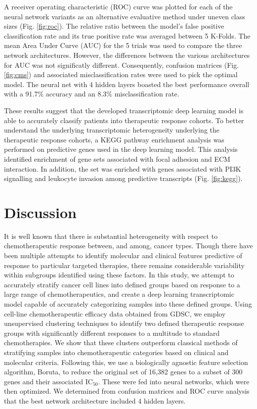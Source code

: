 \documentclass[10pt, letterpaper]{article}
\begin{document}
\begin{multicols}{2}
A receiver operating characteristic (ROC) curve was plotted for each of the neural network variants as an alternative evaluative method under uneven class sizes (Fig. \ref{fig:roc}). The relative ratio between the model’s false positive classification rate and its true positive rate was averaged between 5 K-Folds. The mean Area Under Curve (AUC) for the 5 trials was used to compare the three network architectures. However, the differences between the various architectures for AUC was not significatly different. Consequently, confusion matrices (Fig. \ref{fig:cms}) and associated misclassification rates were used to pick the optimal model. The neural net with 4 hidden layers boasted the best performance overall with a 91.7\% accuracy and an 8.3\% misclassification rate.

These results suggest that the developed transcriptomic deep learning model is able to accurately classify patients into therapeutic response cohorts. To better understand the underlying transcriptomic heterogeneity underlying the therapeutic response cohorts, a KEGG pathway enrichment analysis was performed on predictive genes used in the deep learning model. This analysis identified enrichment of gene sets associated with focal adhesion and ECM interaction. In addition, the set was enriched with genes associated with PI3K signalling and leukocyte invasion among predictive transcripts (Fig. \ref{fig:kegg}).


\section{Discussion}

It is well known that there is substantial heterogeneity with respect to chemotherapeutic response between, and among, cancer types. Though there have been multiple attempts to identify molecular and clinical features predictive of response to particular targeted therapies, there remains considerable variability within subgroups identified using these factors. In this study, we attempt to accurately stratify cancer cell lines into defined groups based on response to a large range of chemotherapeutics, and create a deep learning transcriptomic model capable of accurately categorizing samples into these defined groups. Using cell-line chemotherapeutic efficacy data obtained from GDSC, we employ unsupervised clustering techniques to identify two defined therapeutic response groups with significantly different responses to a multitude to standard chemotherapies. We show that these clusters outperform classical methods of stratifying samples into chemotherapeutic categories based on clinical and molecular criteria. Following this, we use a biologically agnostic feature selection algorithm, Boruta, to reduce the original set of 16,382 genes to a subset of 300 genes and their associated IC$_{50}$. These were fed into neural networks, which were then optimized. We determined from confusion matrices and ROC curve analysis that the best network architecture included 4 hidden layers.


\end{multicols}
\end{document}
